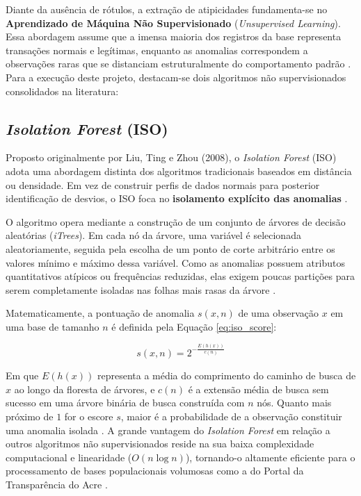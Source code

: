 \documentclass[
    12pt,               %
    openright,          %
    oneside,            %
    a4paper,            %
    chapter=TITLE,      %
    sumario=tradicional,%
    english,            %
    brazilian,          %
 ]{abntex2}
\begin{document}
Diante da ausência de rótulos, a extração de atipicidades fundamenta-se no \textbf{Aprendizado de Máquina Não Supervisionado} (\textit{Unsupervised Learning}). Essa abordagem assume que a imensa maioria dos registros da base representa transações normais e legítimas, enquanto as anomalias correspondem a observações raras que se distanciam estruturalmente do comportamento padrão \cite{goldschmidt2005, nunes2021}. Para a execução deste projeto, destacam-se dois algoritmos não supervisionados consolidados na literatura:

\subsection{\textit{Isolation Forest} (ISO)}

Proposto originalmente por Liu, Ting e Zhou (2008), o \textit{Isolation Forest} (ISO) adota uma abordagem distinta dos algoritmos tradicionais baseados em distância ou densidade. Em vez de construir perfis de dados normais para posterior identificação de desvios, o ISO foca no \textbf{isolamento explícito das anomalias} \cite{liu2008isolation}.

O algoritmo opera mediante a construção de um conjunto de árvores de decisão aleatórias (\textit{iTrees}). Em cada nó da árvore, uma variável é selecionada aleatoriamente, seguida pela escolha de um ponto de corte arbitrário entre os valores mínimo e máximo dessa variável. Como as anomalias possuem atributos quantitativos atípicos ou frequências reduzidas, elas exigem poucas partições para serem completamente isoladas nas folhas mais rasas da árvore \cite{liu2008isolation}.

Matematicamente, a pontuação de anomalia $s(x, n)$ de uma observação $x$ em uma base de tamanho $n$ é definida pela Equação \ref{eq:iso_score}:

\begin{equation}\label{eq:iso_score}
s(x, n) = 2^{-\frac{E(h(x))}{c(n)}}
\end{equation}

Em que $E(h(x))$ representa a média do comprimento do caminho de busca de $x$ ao longo da floresta de árvores, e $c(n)$ é a extensão média de busca sem sucesso em uma árvore binária de busca construída com $n$ nós. Quanto mais próximo de $1$ for o escore $s$, maior é a probabilidade de a observação constituir uma anomalia isolada \cite{liu2008isolation}. A grande vantagem do \textit{Isolation Forest} em relação a outros algoritmos não supervisionados reside na sua baixa complexidade computacional e linearidade ($O(n \log n)$), tornando-o altamente eficiente para o processamento de bases populacionais volumosas como a do Portal da Transparência do Acre \cite{liu2008isolation, pereira2025}.
\end{document}
